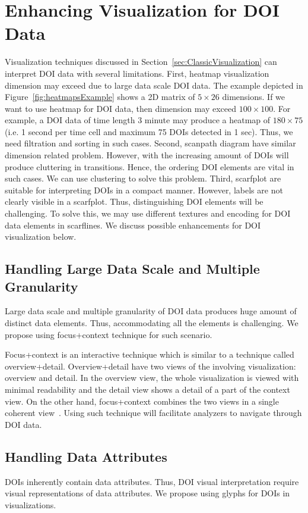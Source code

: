\section{Enhancing Visualization for DOI Data}
Visualization techniques discussed in Section~\ref{sec:ClassicVisualization} can interpret DOI data with several limitations. First, heatmap visualization dimension may exceed due to large data scale DOI data. The example depicted in Figure~\ref{fig:heatmapsExample} shows a 2D matrix of $5 \times 26$ dimensions. If we want to use heatmap for DOI data, then dimension may exceed $100 \times 100$. For example, a DOI data of time length 3 minute may produce a heatmap of $180 \times 75$ (i.e. 1 second per time cell and maximum 75 DOIs detected in 1 sec). Thus, we need filtration and sorting in such cases. Second, scanpath diagram have similar dimension related problem. However, with the increasing amount of DOIs will produce cluttering in transitions. Hence, the ordering DOI elements are vital in such cases. We can use clustering to solve this problem. Third, scarfplot are suitable for interpreting DOIs in a compact manner. However, labels are not clearly visible in a scarfplot. Thus, distinguishing DOI elements will be challenging. To solve this, we may use different textures and encoding for DOI data elements in scarflines. We discuss possible enhancements for DOI visualization below. 

\subsection{Handling Large Data Scale and Multiple Granularity}
\label{sec:LargeDataSupport}
Large data scale and multiple granularity of DOI data produces huge amount of distinct data elements. Thus, accommodating all the elements is challenging. We propose using focus+context technique for such scenario. 

Focus+context is an interactive technique which is similar to a technique called overview+detail. Overview+detail have two views of the involving visualization: overview and detail. In the overview view, the whole visualization is viewed with minimal readability and the detail view shows a detail of a part of the context view. On the other hand, focus+context combines the two views in a single coherent view~\cite{spence1982data}. Using such technique will facilitate analyzers to navigate through DOI data. 

\subsection{Handling Data Attributes}
\label{sec:DataAttributeSupport}
DOIs inherently contain data attributes. Thus, DOI visual interpretation require visual representations of data attributes. We propose using glyphs for DOIs in visualizations. 

